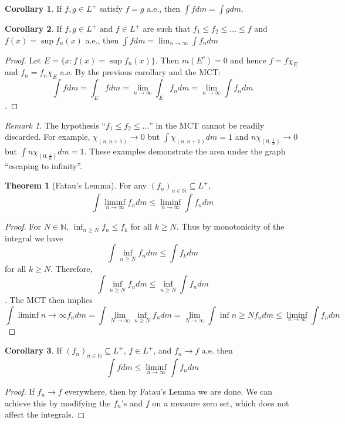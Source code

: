 \documentclass{article}
\theoremstyle{definition}
\newtheorem{theorem}{Theorem}[section]
\newtheorem{corollary}{Corollary}[theorem]
\theoremstyle{remark}
\newtheorem*{remark}{Remark}
\theoremstyle{remark}
\def\naturals{{\mathbb N}}
\begin{document}
\begin{corollary}
If $f, g \in L^{+}$ satisfy $f = g$ a.e., then $\int f dm = \int g dm$.
\end{corollary}
\begin{corollary}
If $f, g \in L^{+}$ and $f \in L^{+}$ are such that $f_1 \leq f_2 \leq \dots \leq f$ and $f(x) = \sup f_n(x)$ a.e., then $\int fdm = \lim_{n\to\infty} \int f_n dm$
\end{corollary}
\begin{proof}
Let $E = \{x: f(x) = \sup f_n(x)\}$. Then $m(E^c) = 0$ and hence $f = f\chi_E$ and $f_n = f_n\chi_E$ a.e. By the previous corollary and the MCT:
$$\int f dm = \int_E f dm = \lim_{n\to\infty} \int_E f_n dm = \lim_{n\to\infty} \int f_n dm$$.
\end{proof}
\begin{remark}
The hypothesis ``$f_1 \leq f_2 \leq \dots$'' in the MCT cannot be readily discarded. For example, $\chi_{(n, n+1)} \to 0$ but $\int \chi_{(n, n+1)} dm = 1$ and $n\chi_{(0, \frac{1}{n})} \to 0$ but $\int n\chi_{(0, \frac{1}{n})} dm = 1$. These examples demonstrate the area under the graph ``escaping to infinity''.
\end{remark}

\begin{theorem}[Fatau's Lemma]
For any $(f_n)_{n\in\naturals} \subseteq L^{+}$,
$$\int \liminf_{n\to\infty} f_n dm \leq \liminf_{n\to\infty} \int f_n dm$$
\end{theorem}
\begin{proof}
For $N\in\naturals$, $\inf_{n\geq N} f_n \leq f_k$ for all $k\geq N$. Thus by monotonicity of the integral we have
$$\int \inf_{n\geq N} f_n dm \leq \int f_k dm$$
 for all $k \geq N$. Therefore,
 $$\int \inf_{n\geq N} f_n dm \leq \inf_{n\geq N} \int f_n dm$$.
 The MCT then implies $$\int \liminf{n\to\infty} f_n dm = \int \lim_{N\to\infty} \inf_{n\geq N} f_n dm = \lim_{N\to\infty} \int \inf{n\geq N} f_n dm \leq \liminf_{n\to\infty} \int f_n dm$$
\end{proof}
\begin{corollary}
If $(f_n)_{n\in\naturals} \subseteq L^{+}$, $f\in L^{+}$, and $f_n \to f$ a.e. then
$$\int f dm \leq \liminf_{n\to\infty} \int f_n dm$$
\end{corollary}
\begin{proof}
If $f_n \to f$ everywhere, then by Fatau's Lemma we are done. We can achieve this by modifying the $f_n$'s and $f$ on a measure zero set, which does not affect the integrals.
\end{proof}
\end{document}
